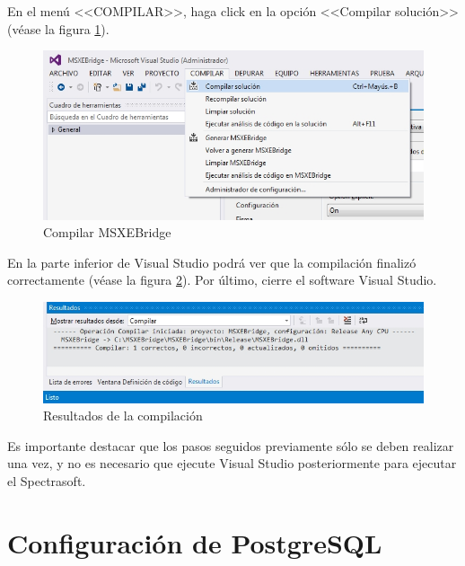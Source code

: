 En el men\'{u} <<COMPILAR>>, haga click en la opci\'{o}n <<Compilar soluci\'{o}n>> (v\'{e}ase la figura \ref{fig:vs-compilar-solucion}).
\vfill
\begin{figure}[H]
  \centering
  \includegraphics[width=1\linewidth]{./img/vs-compilar-solucion.jpg}
\caption[]{Compilar MSXEBridge\label{fig:vs-compilar-solucion}}
\end{figure}
\vfill
En la parte inferior de Visual Studio podr\'{a} ver que la compilaci\'{o}n finaliz\'{o} correctamente (v\'{e}ase la figura \ref{fig:vs-resultados}). Por \'{u}ltimo, cierre el software Visual Studio.
\vfill
\begin{figure}[H]
  \centering
  \includegraphics[width=1\linewidth]{./img/vs-resultados.jpg}
\caption[]{Resultados de la compilaci\'{o}n\label{fig:vs-resultados}}
\end{figure}
\vfill
Es importante destacar que los pasos seguidos previamente s\'{o}lo se deben realizar una vez, y no es necesario que ejecute Visual Studio posteriormente para ejecutar el Spectrasoft.

\newpage

\section*{Configuraci\'{o}n de PostgreSQL}
	
